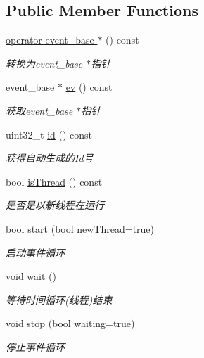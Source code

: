 \subsection*{Public Member Functions}
\begin{DoxyCompactItemize}
\item 
\hypertarget{classec_1_1Loop_ab104699b3b40815f32e5272e85fb01d7}{\hyperlink{classec_1_1Loop_ab104699b3b40815f32e5272e85fb01d7}{operator event\-\_\-base $\ast$} () const }\label{classec_1_1Loop_ab104699b3b40815f32e5272e85fb01d7}

\begin{DoxyCompactList}\small\item\em 转换为event\-\_\-base $\ast$指针 \end{DoxyCompactList}\item 
\hypertarget{classec_1_1Loop_af62f9eae725eda092cc52168bdcb9b53}{event\-\_\-base $\ast$ \hyperlink{classec_1_1Loop_af62f9eae725eda092cc52168bdcb9b53}{ev} () const }\label{classec_1_1Loop_af62f9eae725eda092cc52168bdcb9b53}

\begin{DoxyCompactList}\small\item\em 获取event\-\_\-base $\ast$指针 \end{DoxyCompactList}\item 
\hypertarget{classec_1_1Loop_ae60730f9a1e07de6039de8008293769a}{uint32\-\_\-t \hyperlink{classec_1_1Loop_ae60730f9a1e07de6039de8008293769a}{id} () const }\label{classec_1_1Loop_ae60730f9a1e07de6039de8008293769a}

\begin{DoxyCompactList}\small\item\em 获得自动生成的\-Id号 \end{DoxyCompactList}\item 
\hypertarget{classec_1_1Loop_a134b0eb8eaa83270eb375df11160bea5}{bool \hyperlink{classec_1_1Loop_a134b0eb8eaa83270eb375df11160bea5}{is\-Thread} () const }\label{classec_1_1Loop_a134b0eb8eaa83270eb375df11160bea5}

\begin{DoxyCompactList}\small\item\em 是否是以新线程在运行 \end{DoxyCompactList}\item 
bool \hyperlink{classec_1_1Loop_a5e4e5650fbd4f1716429205c84ca51fd}{start} (bool new\-Thread=true)
\begin{DoxyCompactList}\small\item\em 启动事件循环 \end{DoxyCompactList}\item 
void \hyperlink{classec_1_1Loop_a476329b5b1b32a9d91957fdf820ed35b}{wait} ()
\begin{DoxyCompactList}\small\item\em 等待时间循环(线程)结束 \end{DoxyCompactList}\item 
void \hyperlink{classec_1_1Loop_aa96af9467ac7882e3cea7a4dcb51005a}{stop} (bool waiting=true)
\begin{DoxyCompactList}\small\item\em 停止事件循环 \end{DoxyCompactList}\end{DoxyCompactItemize}
